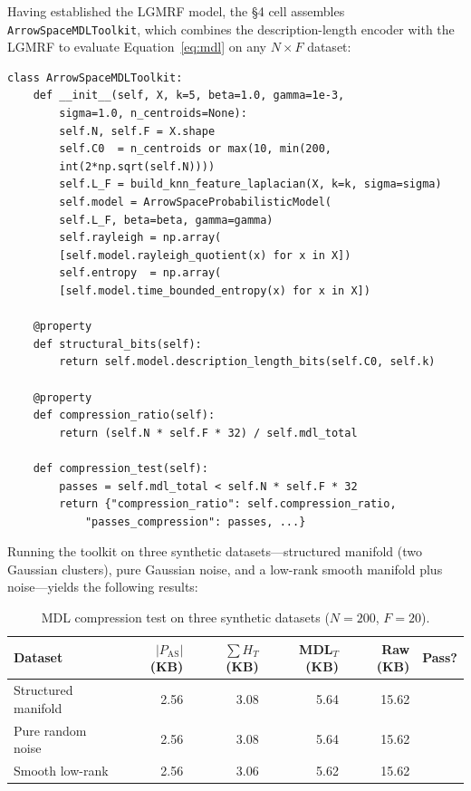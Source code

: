 \documentclass[12pt,a4paper]{article}
\theoremstyle{plain}
\theoremstyle{definition}
\theoremstyle{remark}
\newcommand{\1}{\mathbf{1}}
\begin{document}
	Having established the LGMRF model, the §4 cell assembles
	\texttt{ArrowSpaceMDLToolkit}, which combines the description-length
	encoder with the LGMRF to evaluate Equation~\eqref{eq:mdl} on any
	$N\times F$ dataset:
	
	\begin{lstlisting}[caption={MDL toolkit: compression test over three synthetic datasets},
		label={lst:mdltoolkit}]
class ArrowSpaceMDLToolkit:
	def __init__(self, X, k=5, beta=1.0, gamma=1e-3,
		sigma=1.0, n_centroids=None):
		self.N, self.F = X.shape
		self.C0  = n_centroids or max(10, min(200,
		int(2*np.sqrt(self.N))))
		self.L_F = build_knn_feature_laplacian(X, k=k, sigma=sigma)
		self.model = ArrowSpaceProbabilisticModel(
		self.L_F, beta=beta, gamma=gamma)
		self.rayleigh = np.array(
		[self.model.rayleigh_quotient(x) for x in X])
		self.entropy  = np.array(
		[self.model.time_bounded_entropy(x) for x in X])
		
	@property
	def structural_bits(self):
		return self.model.description_length_bits(self.C0, self.k)
		
	@property
	def compression_ratio(self):
		return (self.N * self.F * 32) / self.mdl_total
		
	def compression_test(self):
		passes = self.mdl_total < self.N * self.F * 32
		return {"compression_ratio": self.compression_ratio,
			"passes_compression": passes, ...}
	\end{lstlisting}
	
	Running the toolkit on three synthetic datasets---structured manifold
	(two Gaussian clusters), pure Gaussian noise, and a low-rank smooth
	manifold plus noise---yields the following results:
	
	\begin{table}[H]
		\centering
		\caption{MDL compression test on three synthetic datasets ($N=200$, $F=20$).}
		\label{tab:synthetic-mdl}
		\begin{tabular}{lrrrrl}
			\toprule
			Dataset & $|P_\mathrm{AS}|$ (KB) & $\sum H_T$ (KB)
			& MDL$_T$ (KB) & Raw (KB) & Pass? \\
			\midrule
			Structured manifold & 2.56 & 3.08 & 5.64 & 15.62 & \checkmark \\
			Pure random noise   & 2.56 & 3.08 & 5.64 & 15.62 & \checkmark \\
			Smooth low-rank     & 2.56 & 3.06 & 5.62 & 15.62 & \checkmark \\
			\bottomrule
		\end{tabular}
	\end{table}
	
\end{document}

